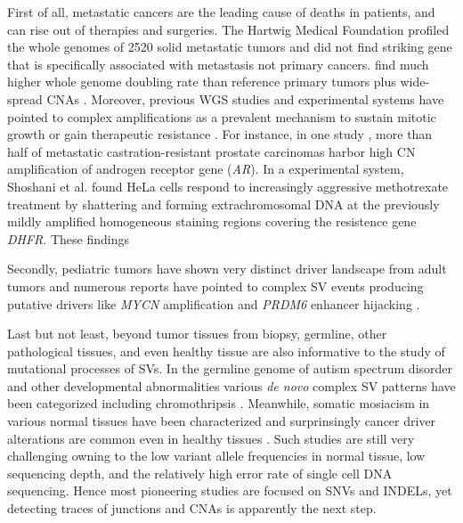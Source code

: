 \documentclass[phd,tocprelim]{cornell}
\begin{document}
First of all, metastatic cancers are the leading cause of deaths in patients, and can rise out of therapies and surgeries. The Hartwig Medical Foundation profiled the whole genomes of 2520 solid metastatic tumors and did not find striking gene that is specifically associated with metastasis not primary cancers. find much higher whole genome doubling rate than reference primary tumors plus wide-spread CNAs \cite{Priestley2019-bw}. Moreover, previous WGS studies and experimental systems have pointed to complex amplifications as a prevalent mechanism to sustain mitotic growth or gain therapeutic resistance \cite{Watkins2020-qp,Viswanathan:2018hi,Van_Dessel2019-gi,Shoshani2020-zj}. For instance, in one study \cite{Van_Dessel2019-gi}, more than half of metastatic castration-resistant prostate carcinomas harbor high CN amplification of androgen receptor gene (\textit{AR}). In a experimental system, Shoshani et al. \cite{Shoshani2020-zj} found HeLa cells respond to increasingly aggressive methotrexate treatment by shattering and forming extrachromosomal DNA at the previously mildly amplified homogeneous staining regions covering the resistence gene \textit{DHFR}. These findings

Secondly, pediatric tumors have shown very distinct driver landscape from adult tumors \cite{Grobner2018-qp} and numerous reports have pointed to complex SV events producing putative drivers like \textit{MYCN} amplification and \textit{PRDM6} enhancer hijacking \cite{Northcott2017-xm}.

Last but not least, beyond tumor tissues from biopsy, germline, other pathological tissues, and even healthy tissue are also informative to the study of mutational processes of SVs. In the germline genome of autism spectrum disorder and other developmental abnormalities various \textit{de novo} complex SV patterns have been categorized including chromothripsis \cite{Collins2017-uc}. Meanwhile, somatic mosiacism in various normal tissues have been characterized and surprinsingly cancer driver alterations are common even in healthy tissues \cite{Martincorena:2018fk,Sekar2020-cv}. Such studies are still very challenging owning to the low variant allele frequencies in normal tissue, low sequencing depth, and the relatively high error rate of single cell DNA sequencing. Hence most pioneering studies are focused on SNVs and INDELs, yet detecting traces of junctions and CNAs is apparently the next step.
\end{document}
